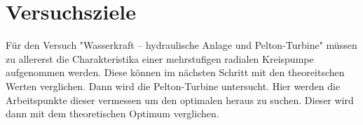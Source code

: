 \section{Versuchsziele}
Für den Versuch "Wasserkraft – hydraulische Anlage und Pelton-Turbine" müssen zu allererst die Charakteristika einer mehrstufigen radialen Kreispumpe aufgenommen werden. Diese können im nächsten Schritt mit den theoreitschen Werten verglichen. Dann wird die Pelton-Turbine untersucht. Hier werden die Arbeitspunkte dieser vermessen um den optimalen heraus zu suchen. Dieser wird dann mit dem theoretischen Optimum verglichen.
